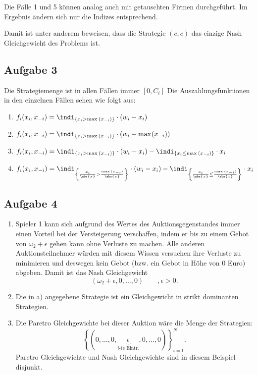 Die Fälle 1 und 5 können analog auch mit getauschten Firmen durchgeführt. Im Ergebnis ändern sich nur die Indizes entsprechend. 

Damit ist unter anderem beweisen, dass die Strategie $(c, c)$ das einzige Nash Gleichgewicht des Problems ist.

\subsection{Aufgabe 3}
\label{sec:Aufgabe 3}

Die Strategiemenge ist in allen Fällen immer $[0,C_{i}]$
Die Auszahlungsfunktionen in den einzelnen Fällen sehen wie folgt aus:
\begin{enumerate}[label=\alph{enumi})]
	\item $f_{i}(x_{i}, x_{-i}) = \indi_{\{ x_{i} > \max_{}{(x_{-i})}\} } \cdot (w_{i} - x_{i})$
	\item $f_{i}(x_{i}, x_{-i}) = \indi_{\{ x_{i} > \max_{}{(x_{-i})}\} } \cdot (w_{i} - \max_{}(x_{-i}))$
	\item $f_{i}(x_{i}, x_{-i}) = \indi_{\{ x_{i} > \max_{}{(x_{-i})}\} } \cdot (w_{i} - x_{i})-\indi_{\{ x_{i} \leq \max_{}{(x_{-i})}\} }\cdot x_{i}$
	\item $f_{i}(x_{i}, x_{-i}) = \indi_{\left\{ \frac{x_{i}}{\abs{x} } > \frac{\max{(x_{-i})}}{\abs{x} }\right\} } \cdot (w_{i} - x_{i})-\indi_{\left\{ \frac{x_{i}}{\abs{x} } \leq \frac{\max_{}{(x_{-i})}}{\abs{x} }\right\} }\cdot x_{i}$
\end{enumerate}

\subsection{Aufgabe 4}
\label{sec:Aufgabe 4}

\begin{enumerate}[label=\alph{enumi})]
	\item Spieler 1 kann sich aufgrund des Wertes des Auktionsgegenstandes immer einen Vorteil bei der Versteigerung verschaffen, indem er bis zu einem Gebot von $\omega _{2} + \epsilon $ gehen kann ohne Verluste zu machen. Alle anderen Auktionsteilnehmer würden mit diesem Wissen versuchen ihre Verluste zu minimieren und deswegen kein Gebot (bzw. ein Gebot in Höhe von 0 Euro) abgeben.
		Damit ist das Nash Gleichgewicht
		\[
			(\omega _{2} +\epsilon ,0,\ldots ,0) \qquad,\epsilon >0
		.\] 
	\item Die in a) angegebene Strategie ist ein Gleichgewicht in strikt dominanten Strategien.
	\item Die Paretro Gleichgewichte bei dieser Auktion wäre die Menge der Strategien:
		\[
			\left\{
				(0,\ldots ,0,\underbrace{\epsilon}_{i \text{-te Eintr.}}  ,0,\ldots ,0)
			\right\}_{i=1}^{N}

		.\] 
		Paretro Gleichgewichte und Nash Gleichgewichte sind in diesem Beispiel disjunkt.
\end{enumerate}

